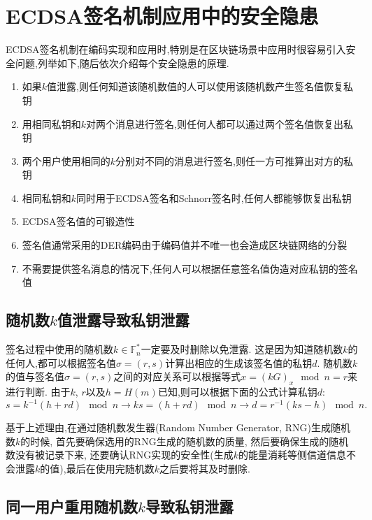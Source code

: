 \documentclass{article}
\newcommand{\F}{\mathbb{F}}
\begin{document}
\section{ECDSA签名机制应用中的安全隐患}

ECDSA签名机制在编码实现和应用时,特别是在区块链场景中应用时很容易引入安全问题,列举如下,随后依次介绍每个安全隐患的原理.
\begin{enumerate}
\item 如果$k$值泄露,则任何知道该随机数值的人可以使用该随机数产生签名值恢复私钥
\item 用相同私钥和$k$对两个消息进行签名,则任何人都可以通过两个签名值恢复出私钥
\item 两个用户使用相同的$k$分别对不同的消息进行签名,则任一方可推算出对方的私钥
\item 相同私钥和$k$同时用于ECDSA签名和Schnorr签名时,任何人都能够恢复出私钥
\item ECDSA签名值的可锻造性
\item 签名值通常采用的DER编码由于编码值并不唯一也会造成区块链网络的分裂
\item 不需要提供签名消息的情况下,任何人可以根据任意签名值伪造对应私钥的签名值
\end{enumerate}

\subsection{随机数$k$值泄露导致私钥泄露}

签名过程中使用的随机数$k\in\F_n^*$一定要及时删除以免泄露.
这是因为知道随机数$k$的任何人,都可以根据签名值$\sigma=(r,s)$计算出相应的生成该签名值的私钥$d$.
随机数$k$的值与签名值$\sigma=(r,s)$之间的对应关系可以根据等式$x = (kG)_x \mod n = r$来进行判断.
由于$k$, $r$以及$h=H(m)$已知,则可以根据下面的公式计算私钥$d$:
$$s=k^{-1}(h+rd) \mod n \rightarrow ks = (h + rd)\mod n \rightarrow d = r^{-1}(ks - h)\mod n.$$

基于上述理由,在通过随机数发生器(Random Number Generator, RNG)生成随机数$k$的时候,
首先要确保选用的RNG生成的随机数的质量, 然后要确保生成的随机数没有被记录下来, 
还要确认RNG实现的安全性(生成$k$的能量消耗等侧信道信息不会泄露$k$的值),最后在使用完随机数$k$之后要将其及时删除.

\subsection{同一用户重用随机数$k$导致私钥泄露\label{subsec-1usereusek}}
\end{document}
